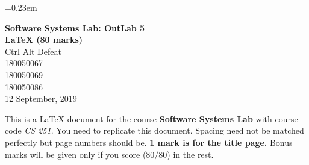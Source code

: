 \documentclass[english,12pt]{article}
\begin{document}
\sloppy
{}\font=0.23em
\begin{titlepage}
\begin{center}
\vspace*{72mm}
\textbf{\Huge{Software Systems Lab: OutLab 5}}\\[3mm]
\textbf{\Huge{\LaTeX{ }(80 marks)}}\\[1cm]
\LARGE{Ctrl Alt Defeat}\\[5mm]
\normalsize{180050067}\\[1mm]
\normalsize{180050069}\\[1mm]
\normalsize{180050086}\\[1cm]
\large{12 September, 2019}
\end{center}
\end{titlepage}
\tableofcontents
{}
\newpage
This is a \LaTeX{} document for the course \textbf{Software Systems Lab} with course code \textit{CS 251}. You need to replicate this document. Spacing need not be matched perfectly but page numbers should be. \textbf{1 mark is for the title page.} Bonus marks will be given only if you score (80/80) in the rest. 
\end{document}
